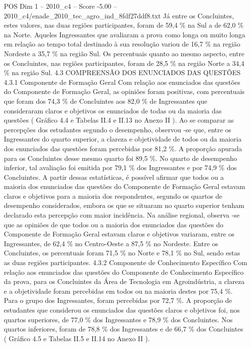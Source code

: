 \begin{textsample}{POS Dim 1 – 2010\_c4 – Score -5.00 – 2010\_c4/enade\_2010\_tec\_agro\_ind\_8fdf27ddf8.txt}
Já entre os Concluintes, estes valores, nas duas regiões participantes, foram de 59,4 \% na Sul a de 62,0 \% na Norte.
Aqueles Ingressantes que avaliaram a prova como longa ou muito longa em relação ao tempo total destinado à sua resolução variou de 16,7 \% na região Nordeste a 35,7 \% na região Sul.
Os percentuais quanto ao mesmo aspecto, entre os Concluintes, nas regiões participantes, foram de 28,5 \% na região Norte a 34,4 \% na região Sul. 4.3 COMPREENSÃO DOS ENUNCIADOS DAS QUESTÕES 4.3.1 Componente de Formação Geral Com relação aos enunciados das questões do Componente de Formação Geral, as opiniões foram positivas, com percentuais que foram dos 74,3 \% de Concluintes aos 82,0 \% de Ingressantes que consideraram claros e objetivos os enunciados de todas ou da maioria das questões ( Gráfico 4.4 e Tabelas II.4 e II.13 no Anexo II ).
Ao se comparar as percepções dos estudantes segundo o desempenho, observou -se que, entre os Ingressantes do quarto superior, a clareza e objetividade de todos ou da maioria dos enunciados das questões foram percebidas por 81,2 \%.
A proporção apurada para os Concluintes desse mesmo quarto foi 89,5 \%.
No quarto de desempenho inferior, tal avaliação foi emitida por 79,1 \% dos Ingressantes e por 74,9 \% dos Concluintes.
A partir dessas estatísticas, é possível afirmar que todos ou a maioria dos enunciados das questões do Componente de Formação Geral estavam claros e objetivos para a maioria dos respondentes, segundo os quartos de desempenho considerados, embora os que se situaram no quarto superior tenham declarado esta percepção com maior incidência.
Na análise regional, observa -se que as opiniões de que todos ou a maioria dos enunciados das questões do Componente de Formação Geral estavam claros e objetivos variaram, entre os Ingressantes, de 62,4 \% no Centro-Oeste a 87,5 \% no Nordeste.
Entre os Concluintes, os percentuais foram 71,5 \% no Norte e 78,1 \% no Sul, sendo estas as duas regiões participantes. 4.3.2 Componente de Conhecimento Específico Com relação aos enunciados das questões do Componente de Conhecimento Específico da prova, para os Concluintes da Área de Tecnologia em Agroindústria, a clareza e a objetividade foram percebidas em todos ou na maioria destes por 75,4 \%.
Para o grupo dos Ingressantes, foram percebidas por 72,7 \%.
A proporção de estudantes que considerou os enunciados das questões claros e objetivos foi, nos quartos superiores, de 77,0 \% dos Ingressantes e 78,9 \% dos Concluintes.
Nos quartos inferiores, foram de 78,8 \% dos Ingressantes e de 66,7 \% dos Concluintes ( Gráfico 4.5 e Tabelas II.5 e II.14 no Anexo II ).

\end{textsample}
